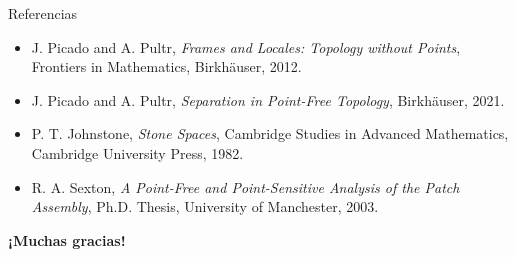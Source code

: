\documentclass[compress,12pt]{beamer}
\begin{document}
\End

\begin{frame}{Referencias}
\small

\begin{itemize}

\item
J. Picado and A. Pultr,
\textit{Frames and Locales: Topology without Points},
Frontiers in Mathematics, Birkh\"auser, 2012.

\medskip

\item
J. Picado and A. Pultr,
\textit{Separation in Point-Free Topology},
Birkh\"auser, 2021.

\medskip

\item
P. T. Johnstone,
\textit{Stone Spaces},
Cambridge Studies in Advanced Mathematics,
Cambridge University Press, 1982.

\medskip

\item
R. A. Sexton,
\textit{A Point-Free and Point-Sensitive Analysis of the Patch Assembly},
Ph.D. Thesis, University of Manchester, 2003.

\end{itemize}

\end{frame}

%
%
%
%

\begin{frame}
      \centering
      \Huge{\bfseries \smiley¡Muchas gracias!\smiley}
\end{frame}
\end{document}

